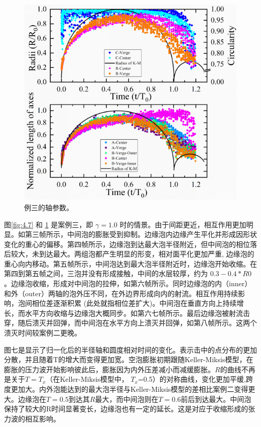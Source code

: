 \begin{figure}[H]
    \centering
    \includegraphics[width=0.8\linewidth]{img/fig4.8.png}
    \caption{例三的轴参数。}
    \label{fig:4.8}
\end{figure}


图\ref{fig:4.7} 和 \ref{fig:4.8} 是案例三，即 $\gamma=1.0$
时的情景。由于间距更近，相互作用更加明显。如第三帧所示，中间泡的膨胀受到抑制。边缘泡内边缘产生平化并形成因形状变化的重心的偏移。第四帧所示，边缘泡到达最大泡半径附近，但中间泡的相位落后较大，未到达最大。两组泡都产生明显的形变，相对面平化更加严重,
边缘泡的重心向内移动。第五帧所示，中间泡达到最大泡半径附近时，边缘泡开始收缩。在第四到第五帧之间，三泡并没有形成接触，中间的水层较厚，约为
$0.3-0.4*R0$。边缘泡收缩，形成对中间泡的拉伸，如第六帧所示。同时边缘泡的内（inner）和外（outer）两轴的泡外压不同，在外边界形成向内的射流。相互作用持续影响，泡间相位差逐渐积累
(此处就指相位差扩大)。中间泡在垂直方向上持续增长，而水平方向收缩与边缘泡大概同步。如第六七帧所示。最后边缘泡被射流击穿，随后溃灭并回弹，而中间泡在水平方向上溃灭并回弹，如第八帧所示。这两个溃灭时间较案例二更晚。

图七是显示了归一化后的半径轴和圆度相对时间的变化。表示击中的点分布的更加分散，并且随着T的增大而变得更加宽。空泡膨胀初期跟随Keller-Miksis模型，在膨胀的压力波开始影响彼此后，膨胀因为内外压差减小而减缓膨胀。$R$的曲线不再是关于$T=T_x$（在Keller-Miksis模型中，
$T_x$=0.5）的对称曲线，变化更加平缓,跨度更加大。内外泡能达到的最大泡半径与Keller-Miksis模型的差相比案例二变得更大。边缘泡在$T=0.5$到达其$R$最大，而中间泡则在$T=0.6$前后到达最大。中间泡保持了较大的R时间显著变长，边缘泡也有一定的延长。这是对应于收缩形成的张力波的相互影响。

